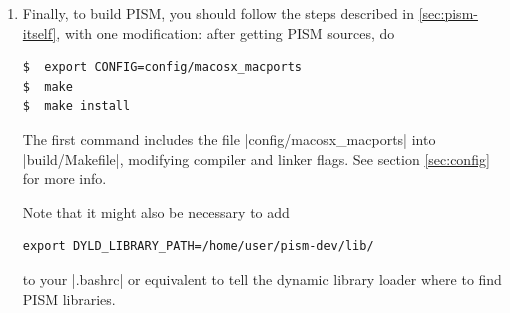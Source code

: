 \documentclass[11pt,final]{amsart}
\begin{document}
\begin{enumerate}
{\begin{verbatim}
       if [ "${LIBNAME}" = "libpetsc" ]; then OTHERLIBS="${PACKAGES_LIBS} ${EXTERNAL_LIB}  ${SYS_LIB} -lm -lc "; fi;\
       if [ "${LIBNAME}" = "libpetscvec" ]; then OTHERLIBS="${PETSC_SYS_LIB_BASIC}"  ; fi;\
       if [ "${LIBNAME}" = "libpetscmat" ]; then OTHERLIBS="${PLAPACK_LIB} ${PETSC_VEC_LIB_BASIC}"  ; fi;\
       if [ "${LIBNAME}" = "libpetscdm" ]; then OTHERLIBS="${PETSC_MAT_LIB_BASIC}"  ; fi;\
       if [ "${LIBNAME}" = "libpetscksp" ]; then OTHERLIBS="${PETSC_DM_LIB_BASIC}"  ; fi;\
       if [ "${LIBNAME}" = "libpetscsnes" ]; then OTHERLIBS="${PETSC_KSP_LIB_BASIC}"  ; fi;\
       if [ "${LIBNAME}" = "libpetscts" ]; then OTHERLIBS="${PETSC_SNES_LIB_BASIC}"  ; fi;\
       if [ "${LIBNAME}" = "libpetscfortran" ]; then OTHERLIBS="${PETSC_TS_LIB_BASIC}"  ; fi;\
       if [ "${LIBNAME}" = "libpetsccontrib" ]; then OTHERLIBS="${PETSC_TS_LIB_BASIC}"  ; fi;\
       if [ "${LIBNAME}" = "libslepc" ]; then OTHERLIBS="${PETSC_KSP_LIB_BASIC}"  ; fi;\
       if [ "${MACOSX_DEPLOYMENT_TARGET}" = "" ]; then MACOSX_DEPLOYMENT_TARGET=10.5; export MACOSX_DEPLOYMENT_TARGET; fi;\
       ${CC}  -dynamiclib -single_module -multiply_defined suppress -undefined dynamic_lookup\
              -o ${INSTALL_LIB_DIR}/$$LIBNAME.dylib *.o -L${PETSC_LIB_DIR}  ${OTHERSHAREDLIBS} ${SL_LINKER_LIBS} $$OTHERLIBS
\end{verbatim}
}
to make PETSc link shared libraries on Mac OS X 10.5 and add |'.dylib'| to lists of file extensions in
|python/PETSc/packages/X11.py| to make PETSc configure script find the X Window System.\footnote{Note that according to Matthew
  Knepley these bugs were actually fixed in the development version. (Which breaks for some other reason. -- CK)}

The next three commands completed the PETSc installation:
\begin{verbatim}
$  export PETSC_DIR=$PWD; export PETSC_ARCH=macosx;
$  ./config/configure.py --with-shared --with-c-support --with-clanguage=cxx\
                         --with-debugging=no --with-fortran=0\
                         --with-blas-lapack-dir=/usr/ --with-mpi-dir=/usr/ 
$  make all test
\end{verbatim}
\item Finally, to build PISM, you should follow the steps described in \ref{sec:pism-itself}, with one modification: after getting
  PISM sources, do
\begin{verbatim}
$  export CONFIG=config/macosx_macports
$  make
$  make install
\end{verbatim}
  The first command includes the file |config/macosx_macports| into |build/Makefile|, modifying compiler and linker flags. See
  section \ref{sec:config} for more info.

  Note that it might also be necessary to add
\begin{verbatim}
export DYLD_LIBRARY_PATH=/home/user/pism-dev/lib/
\end{verbatim}
  to your |.bashrc| or equivalent to tell the dynamic library loader where to find PISM libraries.
\end{enumerate}
\end{document}
